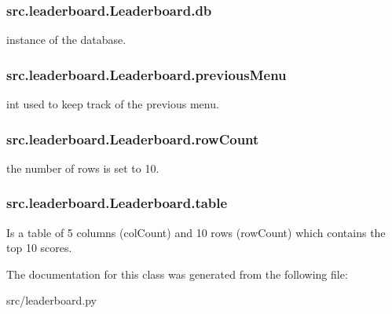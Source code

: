 \subsubsection[{db}]{\setlength{\rightskip}{0pt plus 5cm}src.\+leaderboard.\+Leaderboard.\+db}\label{classsrc_1_1leaderboard_1_1_leaderboard_aa059323abc817556528ae54dd5dbca6b}


instance of the database. 

\hypertarget{classsrc_1_1leaderboard_1_1_leaderboard_abca7271f8092bb5672bf66c04971e04e}{}
\subsubsection[{previous\+Menu}]{\setlength{\rightskip}{0pt plus 5cm}src.\+leaderboard.\+Leaderboard.\+previous\+Menu}\label{classsrc_1_1leaderboard_1_1_leaderboard_abca7271f8092bb5672bf66c04971e04e}


int used to keep track of the previous menu. 

\hypertarget{classsrc_1_1leaderboard_1_1_leaderboard_a48b819acfb54637e30e709361ed32a85}{}
\subsubsection[{row\+Count}]{\setlength{\rightskip}{0pt plus 5cm}src.\+leaderboard.\+Leaderboard.\+row\+Count}\label{classsrc_1_1leaderboard_1_1_leaderboard_a48b819acfb54637e30e709361ed32a85}


the number of rows is set to 10. 

\hypertarget{classsrc_1_1leaderboard_1_1_leaderboard_a1d9b33cb94b8636038320f10d3d2fe30}{}
\subsubsection[{table}]{\setlength{\rightskip}{0pt plus 5cm}src.\+leaderboard.\+Leaderboard.\+table}\label{classsrc_1_1leaderboard_1_1_leaderboard_a1d9b33cb94b8636038320f10d3d2fe30}


Is a table of 5 columns (col\+Count) and 10 rows (row\+Count) which contains the top 10 scores. 



The documentation for this class was generated from the following file\+:\begin{DoxyCompactItemize}
\item 
src/leaderboard.\+py\end{DoxyCompactItemize}

